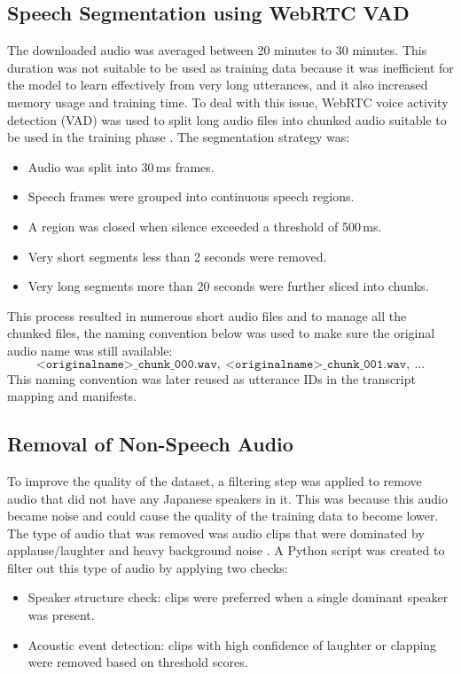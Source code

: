 \subsection{Speech Segmentation using WebRTC VAD}
The downloaded audio was averaged between 20 minutes to 30 minutes. This duration was not suitable to be used as training data because it was inefficient for the model to learn effectively from very long utterances, and it also increased memory usage and training time. To deal with this issue, WebRTC voice activity detection (VAD) was used to split long audio files into chunked audio suitable to be used in the training phase \parencite{webrtc}. The segmentation strategy was:
\begin{itemize}[nosep]
    \item Audio was split into 30\,ms frames.
    \item Speech frames were grouped into continuous speech regions.
    \item A region was closed when silence exceeded a threshold of 500\,ms.
    \item Very short segments less than 2 seconds were removed.
    \item Very long segments more than 20 seconds were further sliced into chunks.
\end{itemize}

\vspace{1em}
This process resulted in numerous short audio files and to manage all the chunked files, the naming convention below was used to make sure the original audio name was still available:
\[
\texttt{<originalname>\_chunk\_000.wav},\ \texttt{<originalname>\_chunk\_001.wav},\ \dots
\]
This naming convention was later reused as utterance IDs in the transcript mapping and manifests.

\subsection{Removal of Non-Speech Audio}
To improve the quality of the dataset, a filtering step was applied to remove audio that did not have any Japanese speakers in it. This was because this audio became noise and could cause the quality of the training data to become lower. The type of audio that was removed was audio clips that were dominated by applause/laughter and heavy background noise \parencite{clap}. A Python script was created to filter out this type of audio by applying two checks:

\begin{itemize}[nosep]
    \item Speaker structure check: clips were preferred when a single dominant speaker was present.
    \item Acoustic event detection: clips with high confidence of laughter or clapping were removed based on threshold scores.
\end{itemize}

